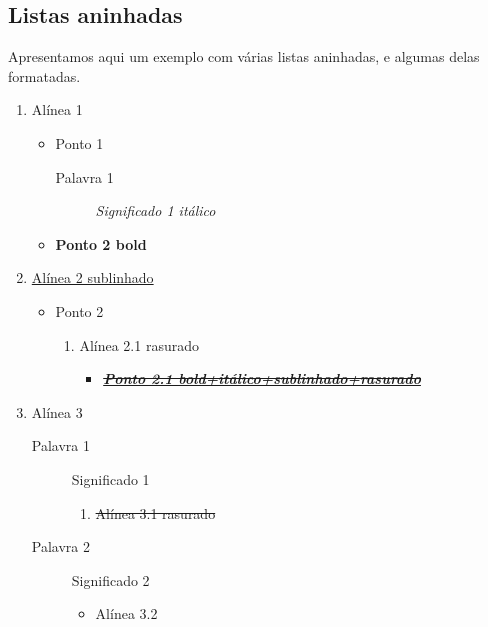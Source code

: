 \documentclass{report}
\begin{document}
\subsection{Listas aninhadas
}
Apresentamos aqui um exemplo com várias listas aninhadas, 
e algumas delas formatadas.
\begin{enumerate}
\item  Alínea 1
    \begin{itemize}
\item  Ponto 1
        \begin{description}
\item[Palavra 1]  \textit{Significado 1 itálico}
        \end{description}
    \item  \textbf{Ponto 2 bold}
    \end{itemize}
\item  \underline{Alínea 2 sublinhado}
    \begin{itemize}
\item  Ponto 2
        \begin{enumerate}
\item  Alínea 2.1 rasurado
            \begin{itemize}
\item  \textbf{\textit{\underline{\sout{Ponto 2.1 bold+itálico+sublinhado+rasurado}}}}
            \end{itemize}
        \end{enumerate}
    \end{itemize}
\item  Alínea 3
    \begin{description}
\item[Palavra 1]  Significado 1
        \begin{enumerate}
\item  \sout{Alínea 3.1 rasurado}
        \end{enumerate}
    \item[Palavra 2]  Significado 2
        \begin{itemize}
\item  Alínea 3.2 
        \end{itemize}
    \end{description}
\end{enumerate}
\end{document}
